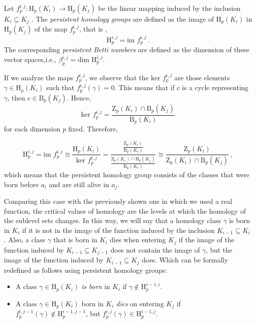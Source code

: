\documentclass[../main.tex]{subfiles}
\begin{document}
\begin{definition}
Let ${f_{p}^{i,j}: \text{H}_p(K_i) \to \text{H}_p(K_j)}$ be the linear mapping induced by the inclusion $K_i \subseteq K_j$ . The \emph{persistent homology groups} are defined as the image of $\text{H}_p(K_i)$ in $\text{H}_p(K_j)$ of the map $f_{p}^{i,j}$, that is ,
\[
\text{H}_{p}^{i,j} = \text{im } f_{p}^{i,j}\,.
\]
The corresponding \emph{persistent Betti numbers} are defined as the dimension of these vector spaces,i.e., $\beta_{p}^{i,j} = \text{dim } \text{H}_{p}^{i,j}$.
\end{definition}

\begin{remark}
If we analyze the maps $f_{p}^{i,j}$, we observe that the $\text{ker } f_{p}^{i,j}$ are those elements $\gamma \in \text{H} _p(K_i)$ such that $f_{p}^{i,j}(\gamma)=0$. This means that if $c$ is a cycle representing $\gamma$, then $c \in \text{B}_p(K_j)$. Hence,
\[
\text{ker } f_{p}^{i,j} = \frac{\text{Z}_p(K_i) \cap \text{B}_p(K_j)}{\text{B}_p(K_i)}
\]
for each dimension $p$ fixed. Therefore,

\[
\text{H}_p^{i,j} = \text{im }f_p^{i,j} \cong \frac{\text{H}_p(K_i)}{\text{ker } f_p^{i,j}} = \frac{\frac{\text{Z}_p(K_i)}{\text{B}_p(K_i)}}{\frac{\text{Z}_p(K_i) \cap \text{B}_p(K_j)}{\text{B}_p(K_i)}} \cong \frac{\text{Z}_p(K_i)}{\text{Z}_p(K_i) \cap \text{B}_p(K_j)}\,,
\]
which means that the persistent homology group consists of the classes that were born before $a_i$ and are still alive in $a_j$.
\end{remark}

Comparing this case with the previously shown one in which we used a real function, the critical values of homology are the levels at which the homology of the sublevel sets changes. In this way, we will say that a homology class $\gamma$ is born in $K_i$ if it is not in the image of the function induced by the inclusion $K_{i-1} \subseteq K_i$. Also, a class $\gamma$ that is born in $K_i$ dies when entering $K_j$ if the image of the function induced by $K_{i-1} \subseteq K_{j-1}$ does not contain the image of $\gamma$, but the image of the function induced by $K_{i-1} \subseteq K_j$ does. Which can be formally redefined as follows using persistent homology groups:

\begin{itemize}
\item A class $\gamma \in \text{H}_p(K_i)$ \emph{is born} in $K_i$ if $\gamma \notin \text{H}_p^{i-1, i}$.
\item A class $\gamma \in \text{H}_p(K_i)$ born in $K_i$ \emph{dies} on entering $K_j$ if $f_{p}^{i,j-1}( \gamma)\notin \text{H}_p^{i-1, j-1}$, but $f_p^{i,j}(\gamma)\in \text{H}_p^{i-1, j}$.
\end{itemize}
\end{document}
